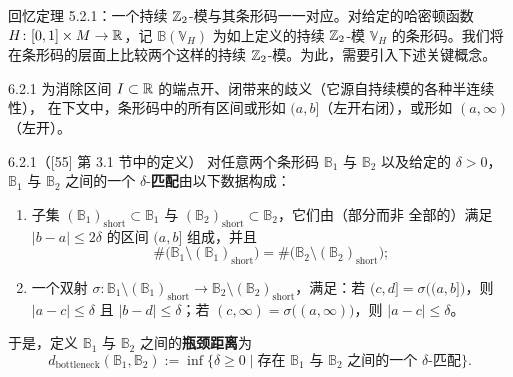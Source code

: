 回忆定理 5.2.1：一个持续 $\mathbb{Z}_2$-模与其条形码一一对应。对给定的哈密顿函数
$H\colon[0,1]\times M\to\mathbb{R}$，记 $\mathbb{B}(\mathbb{V}_H)$ 为如上定义的持续
$\mathbb{Z}_2$-模 $\mathbb{V}_H$ 的条形码。我们将在条形码的层面上比较两个这样的持续
$\mathbb{Z}_2$-模。为此，需要引入下述关键概念。

\begin{wrem}{6.2.1}
  为消除区间 $I\subset\mathbb{R}$ 的端点开、闭带来的歧义（它源自持续模的各种半连续性），
  在下文中，条形码中的所有区间或形如 $(a,b]$（左开右闭），或形如 $(a,\infty)$
  （左开）。
\end{wrem}

\begin{wdefn}{6.2.1（[55] 第 3.1 节中的定义）}
  对任意两个条形码 $\mathbb{B}_1$ 与 $\mathbb{B}_2$ 以及给定的 $\delta>0$，
  $\mathbb{B}_1$ 与 $\mathbb{B}_2$ 之间的一个 $\delta$-\textbf{匹配}由以下数据构成：
  \begin{enumerate}[label=(\roman*)]
    \item 子集 $(\mathbb{B}_1)_{\mathrm{short}}\subset\mathbb{B}_1$ 与
          $(\mathbb{B}_2)_{\mathrm{short}}\subset\mathbb{B}_2$，它们由（部分而非
          全部的）满足 $|b-a|\le 2\delta$ 的区间 $(a,b]$ 组成，并且
          \[
            \#\bigl(\mathbb{B}_1\setminus(\mathbb{B}_1)_{\mathrm{short}}\bigr)
            =\#\bigl(\mathbb{B}_2\setminus(\mathbb{B}_2)_{\mathrm{short}}\bigr);
          \]
    \item 一个双射
          $\sigma\colon\mathbb{B}_1\setminus(\mathbb{B}_1)_{\mathrm{short}}
          \to\mathbb{B}_2\setminus(\mathbb{B}_2)_{\mathrm{short}}$，满足：若
          $(c,d]=\sigma\bigl((a,b]\bigr)$，则 $|a-c|\le\delta$ 且
          $|b-d|\le\delta$；若 $(c,\infty)=\sigma\bigl((a,\infty)\bigr)$，则
          $|a-c|\le\delta$。
  \end{enumerate}
  于是，定义 $\mathbb{B}_1$ 与 $\mathbb{B}_2$ 之间的\textbf{瓶颈距离}为
  \[
    d_{\mathrm{bottleneck}}(\mathbb{B}_1,\mathbb{B}_2)
    :=\inf\{\delta\ge 0\mid
    \text{存在 }\mathbb{B}_1\text{ 与 }\mathbb{B}_2\text{ 之间的一个 }
    \delta\text{-匹配}\}.
  \]
\end{wdefn}


